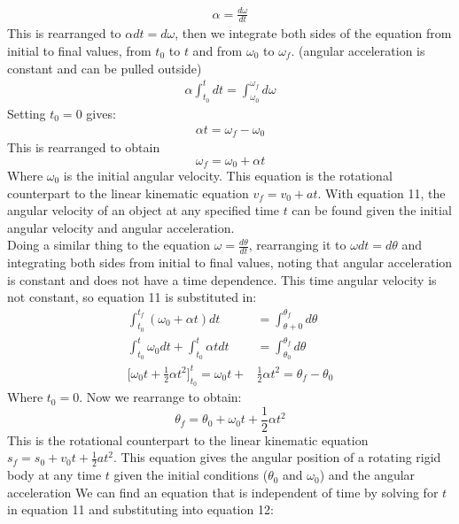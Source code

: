 \documentclass[a4paper]{article}
\newcommand\der[2]{\frac{d #1}{d #2}}
\begin{document}
\begin{align*}
    \alpha = \der{\omega}{t}
\end{align*}
This is rearranged to $\alpha dt = d\omega$, then we integrate both sides of the equation from initial to final values, from $t_0$ to $t$ and from $\omega_0$ to $\omega_f$. (angular acceleration is constant and can be pulled outside)
\begin{align*}
    \alpha\int_{t_0}^{t}dt = \int_{\omega_0}^{\omega_f}d\omega
\end{align*}
Setting $t_0 = 0$ gives:
\begin{align*}
    \alpha t = \omega_f - \omega_0
\end{align*}
This is rearranged to obtain 
\begin{equation}
    \omega_f = \omega_0 + \alpha t
\end{equation}
Where $\omega_0$ is the initial angular velocity. This equation is the rotational counterpart to the linear kinematic equation $v_f = v_0 + at$. With equation 11, the angular velocity of an object at any specified time $t$ can be found given the initial angular velocity and angular acceleration.
\vspace{1mm}\\
Doing a similar thing to the equation $\omega = \der{\theta}{t}$, rearranging it to $\omega dt = d\theta$ and integrating both sides from initial to final values, noting that angular acceleration is constant and does not have a time dependence. This time angular velocity is not constant, so equation 11 is substituted in:
\begin{align*}
    \int_{t_0}^{t_f}(\omega_0 + \alpha t)dt &= \int_{\theta+0}^{\theta_f}d\theta\\
    \int_{t_0}^{t}\omega_0dt + \int_{t_0}^{t}\alpha t dt &= \int_{\theta_0}^{\theta_f}d\theta\\
    \bigg[\omega_0t + \frac{1}{2}\alpha t^2\bigg]_{t_0}^t = \omega_0t + &\frac{1}{2}\alpha t^2 = \theta_f - \theta_0
\end{align*}
Where $t_0 = 0$. Now we rearrange to obtain:
\begin{equation}
    \theta_f = \theta_0 + \omega_0t + \frac{1}{2}\alpha t^2
\end{equation}
This is the rotational counterpart to the linear kinematic equation $s_f = s_0 + v_0t + \frac{1}{2}at^2$. This equation gives the angular position of a rotating rigid body at any time $t$ given the initial conditions ($\theta_0$ and $\omega_0$) and the angular acceleration
\newpage
\noindent We can find an equation that is independent of time by solving for $t$ in equation 11 and substituting into equation 12:
\end{document}
